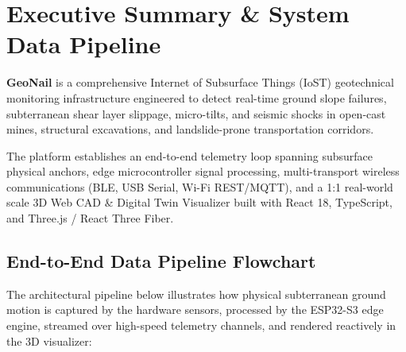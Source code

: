 \documentclass[11pt,a4paper]{article}
\begin{document}
\newpage

\section{Executive Summary \& System Data Pipeline}

\textbf{GeoNail} is a comprehensive Internet of Subsurface Things (IoST) geotechnical monitoring infrastructure engineered to detect real-time ground slope failures, subterranean shear layer slippage, micro-tilts, and seismic shocks in open-cast mines, structural excavations, and landslide-prone transportation corridors.

The platform establishes an end-to-end telemetry loop spanning subsurface physical anchors, edge microcontroller signal processing, multi-transport wireless communications (BLE, USB Serial, Wi-Fi REST/MQTT), and a 1:1 real-world scale 3D Web CAD \& Digital Twin Visualizer built with React 18, TypeScript, and Three.js / React Three Fiber.

\subsection{End-to-End Data Pipeline Flowchart}
The architectural pipeline below illustrates how physical subterranean ground motion is captured by the hardware sensors, processed by the ESP32-S3 edge engine, streamed over high-speed telemetry channels, and rendered reactively in the 3D visualizer:
\end{document}
